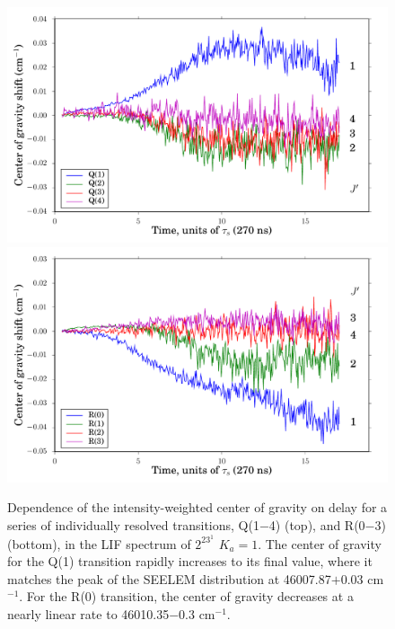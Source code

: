 \documentclass[12pt]{mitthesis}
\newcommand{\rcm}{cm$^{-1}$}
\newcommand{\Ka}[1]{$K_a\!\!=\!#1$}
\begin{document}
\begin{figure}
  \caption{Dependence of the intensity-weighted center of gravity on
    delay for a series of individually resolved transitions, Q(1$-$4)
    (top), and R(0$-$3) (bottom), in the LIF spectrum of $2^23^1$
    \Ka{1}.  The center of gravity for the Q(1) transition rapidly
    increases to its final value, where it matches the peak of the
    SEELEM distribution at 46007.87$+$0.03 \rcm.  For the R(0)
    transition, the center of gravity decreases at a nearly linear
    rate to 46010.35$-$0.3 \rcm.}
  \label{fig:2231-cog-delay}
  \centering
  \vspace{5mm}
  \includegraphics[width=6in]{2231-q1234-cog-delay.pdf}
  \includegraphics[width=6in]{2231-r0123-cog-delay.pdf}
\end{figure}

\end{document}
